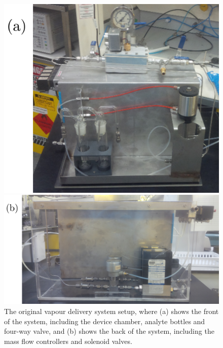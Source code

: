 \documentclass[
  a4paper,
]{scrbook}
\begin{document}
\begin{figure}

\begin{minipage}[t]{0.36\linewidth}

{\centering 

\includegraphics{figures/ch5/original_system_front_edited.png} {}

}

\end{minipage}%
%
\begin{minipage}[t]{0.64\linewidth}

{\centering 

\includegraphics{figures/ch5/original_system_back_edited.png} {}

}

\end{minipage}%

\caption{\label{fig-original-setup}The original vapour delivery system
setup, where (a) shows the front of the system, including the device
chamber, analyte bottles and four-way valve, and (b) shows the back of
the system, including the mass flow controllers and solenoid valves.}

\end{figure}
\end{document}
